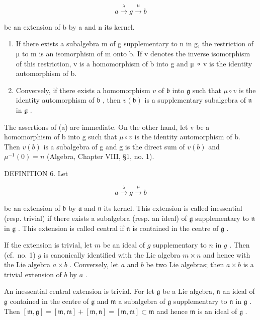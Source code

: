 \[
a \xrightarrow {\lambda} g \xrightarrow {\mu} b
\]

be an extension of b by a and n its kernel.

\begin{enumerate}
\def\labelenumi{(\alph{enumi})}
\item
  If there exists a subalgebra m of g supplementary to n in g, the restriction of μ to m is an isomorphism of m onto b. If v denotes the inverse isomorphism of this restriction, v is a homomorphism of b into g and μ ∘ v is the identity automorphism of b.
\item
  Conversely, if there exists a homomorphism \(v\) of \(\mathfrak{b}\) into \(\mathfrak{g}\) such that \(\mu \circ v\) is the identity automorphism of \(\mathfrak{b}\) , then \(v(\mathfrak{b})\) is a supplementary subalgebra of \(\mathfrak{n}\) in \(\mathfrak{g}\) .
\end{enumerate}

The assertions of (a) are immediate. On the other hand, let v be a homomorphism of b into g such that \(\mu \circ v\) is the identity automorphism of b. Then \(v(b)\) is a subalgebra of g and g is the direct sum of \(v(b)\) and \(\mu^{-1}(0) = n\) (Algebra, Chapter VIII, §1, no. 1).

DEFINITION 6. Let

\[
a \xrightarrow {\lambda} g \xrightarrow {\mu} b
\]

be an extension of \(\mathfrak{b}\) by \(\mathfrak{a}\) and \(\mathfrak{n}\) its kernel. This extension is called inessential (resp. trivial) if there exists a subalgebra (resp. an ideal) of \(\mathfrak{g}\) supplementary to \(\mathfrak{n}\) in \(\mathfrak{g}\) . This extension is called central if \(\mathfrak{n}\) is contained in the centre of \(\mathfrak{g}\) .

If the extension is trivial, let \(m\) be an ideal of \(g\) supplementary to \(n\) in \(g\) . Then (cf.~no. 1) \(g\) is canonically identified with the Lie algebra \(m \times n\) and hence with the Lie algebra \(a \times b\) . Conversely, let \(a\) and \(b\) be two Lie algebras; then \(a \times b\) is a trivial extension of \(b\) by \(a\) .

An inessential central extension is trivial. For let \(\mathfrak{g}\) be a Lie algebra, \(\mathfrak{n}\) an ideal of \(\mathfrak{g}\) contained in the centre of \(\mathfrak{g}\) and \(\mathfrak{m}\) a subalgebra of \(\mathfrak{g}\) supplementary to \(\mathfrak{n}\) in \(\mathfrak{g}\) . Then \([\mathfrak{m},\mathfrak{g}] = [\mathfrak{m},\mathfrak{m}] + [\mathfrak{m},\mathfrak{n}] = [\mathfrak{m},\mathfrak{m}] \subset \mathfrak{m}\) and hence \(\mathfrak{m}\) is an ideal of \(\mathfrak{g}\) .

